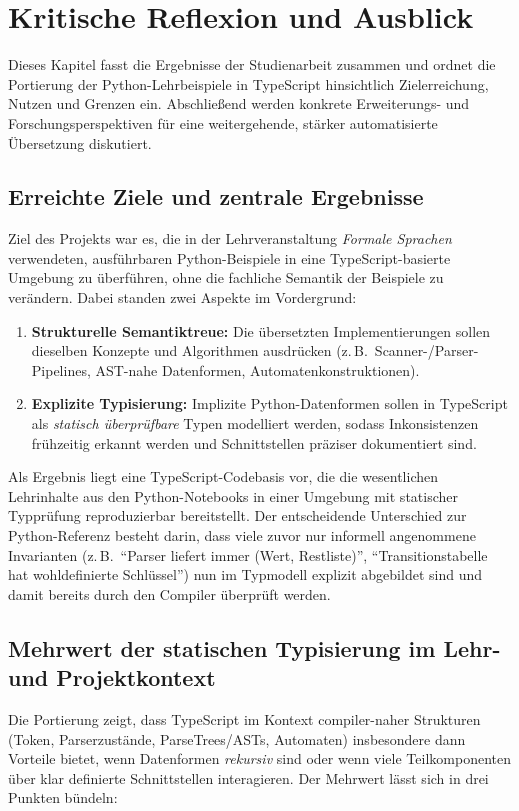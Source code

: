 \section{Kritische Reflexion und Ausblick}
\label{sec:zusammenfassung}

Dieses Kapitel fasst die Ergebnisse der Studienarbeit zusammen und ordnet die Portierung der Python-Lehrbeispiele in TypeScript hinsichtlich Zielerreichung, Nutzen und Grenzen ein. Abschließend werden konkrete Erweiterungs- und Forschungsperspektiven für eine weitergehende, stärker automatisierte Übersetzung diskutiert.

\subsection{Erreichte Ziele und zentrale Ergebnisse}
Ziel des Projekts war es, die in der Lehrveranstaltung \emph{Formale Sprachen} verwendeten, ausführbaren Python-Beispiele in eine TypeScript-basierte Umgebung zu überführen, ohne die fachliche Semantik der Beispiele zu verändern. Dabei standen zwei Aspekte im Vordergrund:

\begin{enumerate}
  \item \textbf{Strukturelle Semantiktreue:} Die übersetzten Implementierungen sollen dieselben Konzepte und Algorithmen ausdrücken (z.\,B.\ Scanner-/Parser-Pipelines, AST-nahe Datenformen, Automatenkonstruktionen).
  \item \textbf{Explizite Typisierung:} Implizite Python-Datenformen sollen in TypeScript als \emph{statisch überprüfbare} Typen modelliert werden, sodass Inkonsistenzen frühzeitig erkannt werden und Schnittstellen präziser dokumentiert sind. \autocite[S.44ff]{vanderkam2019effective}
\end{enumerate}

Als Ergebnis liegt eine TypeScript-Codebasis vor, die die wesentlichen Lehrinhalte aus den Python-Notebooks in einer Umgebung mit statischer Typprüfung reproduzierbar bereitstellt. Der entscheidende Unterschied zur Python-Referenz besteht darin, dass viele zuvor nur informell angenommene Invarianten (z.\,B.\ ``Parser liefert immer (Wert, Restliste)'', ``Transitionstabelle hat wohldefinierte Schlüssel'') nun im Typmodell explizit abgebildet sind und damit bereits durch den Compiler überprüft werden.

\subsection{Mehrwert der statischen Typisierung im Lehr- und Projektkontext}
Die Portierung zeigt, dass TypeScript im Kontext compiler-naher Strukturen (Token, Parserzustände, ParseTrees/ASTs, Automaten) insbesondere dann Vorteile bietet, wenn Datenformen \emph{rekursiv} sind oder wenn viele Teilkomponenten über klar definierte Schnittstellen interagieren. Der Mehrwert lässt sich in drei Punkten bündeln:

